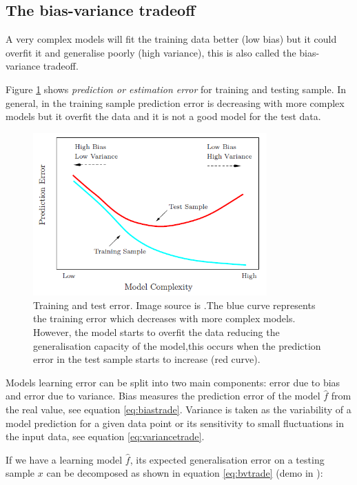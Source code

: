 \subsection{The bias-variance tradeoff} \label{sec:biasvar}

A very complex models will fit the training data better (low bias) but it could
overfit it and generalise poorly (high variance), this is also called the
bias-variance tradeoff.  

Figure \ref{fig:traintesterror} shows {\em prediction or estimation error} for
training and testing sample.  In general, in the training sample prediction
error is decreasing with more complex models but it overfit the data and it is
not a good model for the test data. 

\begin{figure}[!h]
  \centering
  \includegraphics[width=0.8\textwidth]{img/model_complexity}
  \caption{Training and test error. Image source is
\cite{friedman2001elements}.The blue curve represents the training error which
decreases with more complex models. However, the model starts to overfit the
data reducing the generalisation capacity of the model,this occurs when the
prediction error in the test sample starts to increase (red curve).}
  \label{fig:traintesterror}
\end{figure}

Models learning error can be split into two main components: error due to bias
and error due to variance. Bias measures the prediction error of the model
$\hat{f}$ from the real value, see equation \ref{eq:biastrade}. Variance is
taken as the variability of a model prediction for a given data point or its
sensitivity to small fluctuations in the input data, see equation
\ref{eq:variancetrade}.

If we have a learning model $\hat{f}$, its expected generalisation error on a
testing sample $x$ can be decomposed as shown in equation \ref{eq:bvtrade} (demo
in \cite{geman1992neural}):

